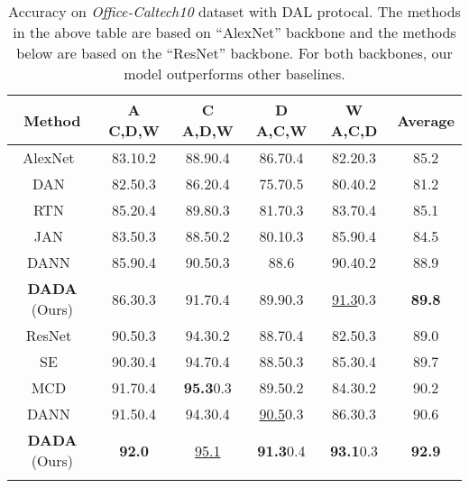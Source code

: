 \documentclass{article}
\begin{document}
\begin{table*}[t]

    \addtolength{\tabcolsep}{1pt}
    \caption{Accuracy on \emph{Office-Caltech10} dataset with DAL protocal. The methods in the above table are based on ``AlexNet'' backbone and the methods below are based on the ``ResNet'' backbone. For both backbones, our model outperforms other baselines. } \label{table_office}
    \vspace{0.1in}
    \centering
    
    \label{table:office10}
    \begin{tabular}{cccccc}
        \Xhline{1pt}
        Method & A  C,D,W & C  A,D,W & D  A,C,W & W  A,C,D & Average \\
        \hline
        AlexNet~\cite{alexnet}& 83.10.2 & 88.90.4 & 86.70.4  & 82.20.3& 85.2 \\
        DAN~\cite{long2015} & 82.50.3 & 86.20.4& 75.70.5& 80.40.2 & 81.2 \\
        
        RTN~\cite{RTN} & 85.20.4 & 89.80.3 & 81.70.3& 83.70.4 & 85.1 \\
        JAN~\cite{JAN} & 83.50.3& 88.50.2 & 80.10.3& 85.90.4 & 84.5 \\
        DANN~\cite{DANN} & 85.90.4 & 90.50.3 & 88.6& 90.40.2& 88.9  \\
        \textbf{DADA} (Ours) & 86.30.3 &91.70.4 & 89.90.3 & \underline{91.3}0.3 & \textbf{89.8}\\
        \Xhline{1pt}
        ResNet~\cite{resnet} & 90.50.3 & 94.30.2 & 88.70.4 &82.50.3 & 89.0\\
        SE~\cite{SE} & 90.30.4 & 94.70.4 & 88.50.3 & 85.30.4 & 89.7 \\
        MCD~\cite{MCD_2018} & 91.70.4 &\textbf{95.3}0.3 & 89.50.2 & 84.30.2  & 90.2 \\ 
        DANN~\cite{DANN} & 91.50.4 &94.30.4&\underline{90.5}0.3&86.30.3 & 90.6\\
\textbf{DADA} (Ours) &\textbf{92.0}& \underline{95.1} & \textbf{91.3}0.4& \textbf{93.1}0.3&\textbf{92.9}\\
	     \hline
        
        \Xhline{1pt}
    \end{tabular}
    

\end{table*}
\end{document}
